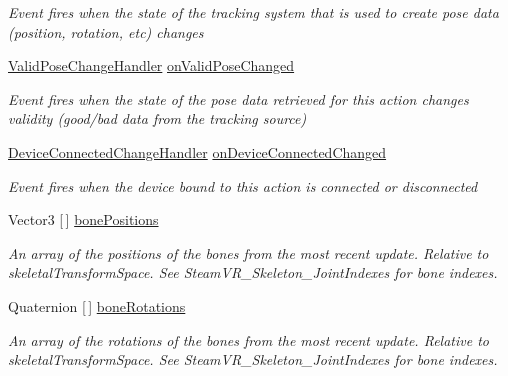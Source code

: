 \begin{DoxyCompactItemize}
\begin{DoxyCompactList}\small\item\em Event fires when the state of the tracking system that is used to create pose data (position, rotation, etc) changes \end{DoxyCompactList}\item 
\mbox{\hyperlink{class_valve_1_1_v_r_1_1_steam_v_r___action___skeleton_af5ad5e815b7f555aa33ee8b74385e89e}{Valid\+Pose\+Change\+Handler}} \mbox{\hyperlink{class_valve_1_1_v_r_1_1_steam_v_r___action___skeleton_ae6921e89e087c4183ccf6167ca37cd61}{on\+Valid\+Pose\+Changed}}
\begin{DoxyCompactList}\small\item\em Event fires when the state of the pose data retrieved for this action changes validity (good/bad data from the tracking source) \end{DoxyCompactList}\item 
\mbox{\hyperlink{class_valve_1_1_v_r_1_1_steam_v_r___action___skeleton_a737d68e8f67790bf838b4f5bac3ffae1}{Device\+Connected\+Change\+Handler}} \mbox{\hyperlink{class_valve_1_1_v_r_1_1_steam_v_r___action___skeleton_a91459f7239653ba24ef381285c999069}{on\+Device\+Connected\+Changed}}
\begin{DoxyCompactList}\small\item\em Event fires when the device bound to this action is connected or disconnected \end{DoxyCompactList}\item 
Vector3 \mbox{[}$\,$\mbox{]} \mbox{\hyperlink{class_valve_1_1_v_r_1_1_steam_v_r___action___skeleton_a092641b5beefd58f97d6a8c2b7d98d8e}{bone\+Positions}}
\begin{DoxyCompactList}\small\item\em An array of the positions of the bones from the most recent update. Relative to skeletal\+Transform\+Space. See Steam\+V\+R\+\_\+\+Skeleton\+\_\+\+Joint\+Indexes for bone indexes. \end{DoxyCompactList}\item 
Quaternion \mbox{[}$\,$\mbox{]} \mbox{\hyperlink{class_valve_1_1_v_r_1_1_steam_v_r___action___skeleton_a2f7203dd3e199a64b8c14cb0472cfd4e}{bone\+Rotations}}
\begin{DoxyCompactList}\small\item\em An array of the rotations of the bones from the most recent update. Relative to skeletal\+Transform\+Space. See Steam\+V\+R\+\_\+\+Skeleton\+\_\+\+Joint\+Indexes for bone indexes. \end{DoxyCompactList}\item 

\end{DoxyCompactItemize}
